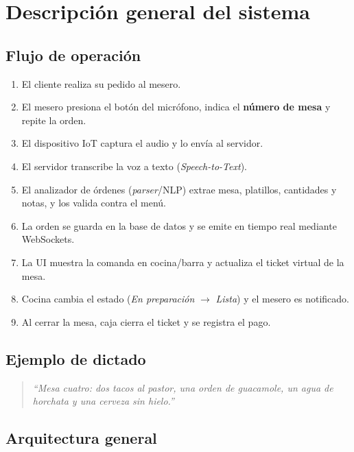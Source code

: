 \documentclass[11pt,letterpaper]{article}
\begin{document}
\section{Descripción general del sistema}
\subsection{Flujo de operación}
\begin{enumerate}[noitemsep]
  \item El cliente realiza su pedido al mesero.
  \item El mesero presiona el botón del micrófono, indica el \textbf{número de mesa} y repite la orden.
  \item El dispositivo IoT captura el audio y lo envía al servidor.
  \item El servidor transcribe la voz a texto (\textit{Speech-to-Text}).
  \item El analizador de órdenes (\textit{parser}/NLP) extrae mesa, platillos, cantidades y notas, y los valida contra el menú.
  \item La orden se guarda en la base de datos y se emite en tiempo real mediante WebSockets.
  \item La UI muestra la comanda en cocina/barra y actualiza el ticket virtual de la mesa.
  \item Cocina cambia el estado (\textit{En preparación} $\rightarrow$ \textit{Lista}) y el mesero es notificado.
  \item Al cerrar la mesa, caja cierra el ticket y se registra el pago.
\end{enumerate}

\subsection{Ejemplo de dictado}
\begin{quote}
\textit{``Mesa cuatro: dos tacos al pastor, una orden de guacamole, un agua de horchata y una cerveza sin hielo.''}
\end{quote}

\subsection{Arquitectura general}
\end{document}
